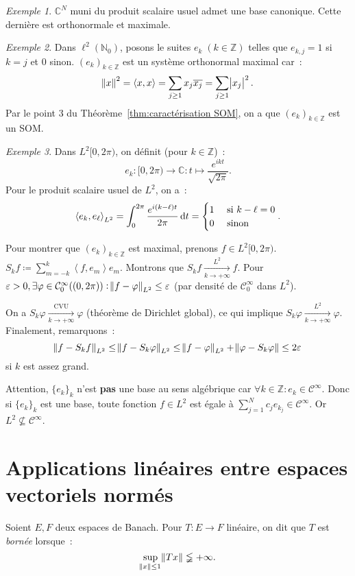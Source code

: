 \documentclass{report}
\newcommand{\C}{{\mathbb C}}
\newcommand{\Z}{{\mathbb Z}}
\newcommand{\N}{{\mathbb N}}
\newcommand{\scpr}[2]{\left\langle#1, #2\right\rangle}
\newcommand{\pinfty}{{+\infty}}
\theoremstyle{definition}
\theoremstyle{remark}
\newtheorem{ex}{Exemple}[chapter]
\begin{document}
\begin{ex}
$\C^N$ muni du produit scalaire usuel admet une base canonique. Cette dernière est orthonormale et maximale.
\end{ex}

\begin{ex}
Dans $\ell^2(\N_0)$, posons le suites $e_k \; (k \in \Z)$ telles que $e_{k,j} = 1$ si $k=j$ et $0$ sinon. $(e_k)_{k \in \Z}$ est un système orthonormal maximal car~:
\[\norm x^2 = \scpr xx = \sum_{j \geq 1}x_j\overline {x_j} = \sum_{j \geq 1}\abs {x_j}^2.\]
Par le point 3 du Théorème~\ref{thm:caractérisation SOM}, on a que $(e_k)_{k \in \Z}$ est un SOM.
\end{ex}

\begin{ex}
Dans $L^2[0, 2\pi)$, on définit (pour $k \in \Z$)~:
\[e_k : [0, 2\pi) \to \C : t \mapsto \frac {e^{ikt}}{\sqrt {2\pi}}.\]
Pour le produit scalaire usuel de $L^2$, on a~:
\[\scpr {e_k}{e_\ell}_{L^2} = \int_0^{2\pi}\frac {e^{i(k-\ell)t}}{2\pi}\dif t = \begin{cases}1 &\text{ si } k-\ell = 0 \\0 &\text{ sinon}\end{cases}.\]

Pour montrer que $(e_k)_{k \in \Z}$ est maximal, prenons $f \in L^2[0, 2\pi)$. $S_kf \coloneqq \sum_{m=-k}^k\scpr f{e_m}e_m.$ Montrons que $S_kf \xrightarrow[k \to \pinfty]{L^2} f$.
Pour $\varepsilon > 0, \exists \varphi \in \mathcal C_0^\infty((0, 2\pi)) : \norm {f-\varphi}_{L^2} \leq \varepsilon$ (par densité de $\mathcal C_0^\infty$ dans $L^2$).

On a $S_k\varphi \xrightarrow[k \to \pinfty]{\text{CVU}} \varphi$ (théorème de Dirichlet global), ce qui implique $S_k\varphi \xrightarrow[k \to \pinfty]{L^2} \varphi$.
Finalement, remarquons~:
\[\norm {f-S_kf}_{L^2} \leq \norm {f-S_k\varphi}_{L^2} \leq \norm {f-\varphi}_{L^2} + \norm {\varphi - S_k\varphi} \leq 2\varepsilon\]
si $k$ est assez grand.

Attention, $\{e_k\}_k$ n'est \textbf{pas} une base au sens algébrique car $\forall k \in \Z : e_k \in \mathcal C^\infty$. Donc si $\{e_k\}_k$ est une base, toute fonction $f \in L^2$ est
égale à $\sum_{j=1}^Nc_je_{k_j} \in \mathcal C^\infty$. Or $L^2 \not \subseteq \mathcal C^\infty$.
\end{ex}

\section{Applications linéaires entre espaces vectoriels normés}
Soient $E, F$ deux espaces de Banach. Pour $T : E \to F$ linéaire, on dit que $T$ est \textit{bornée} lorsque~:
\[\sup_{\norm x \leq 1}\norm {Tx} \lneqq \pinfty.\]
\end{document}
